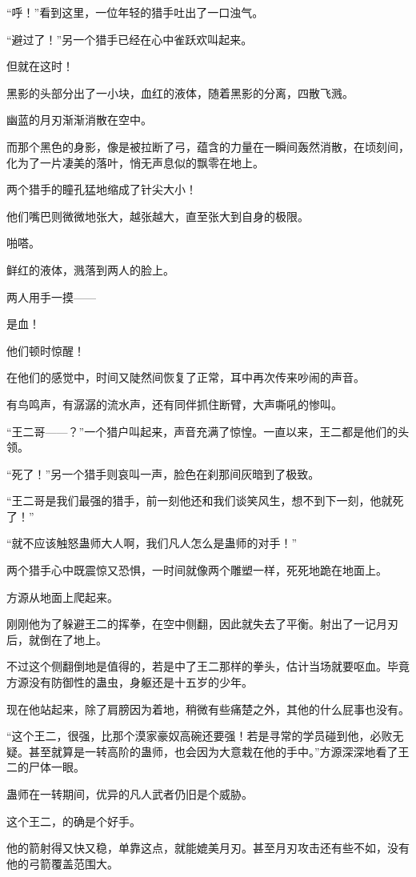 \begin{this_body}
“呼！”看到这里，一位年轻的猎手吐出了一口浊气。

“避过了！”另一个猎手已经在心中雀跃欢叫起来。

但就在这时！

黑影的头部分出了一小块，血红的液体，随着黑影的分离，四散飞溅。

幽蓝的月刃渐渐消散在空中。

而那个黑色的身影，像是被拉断了弓，蕴含的力量在一瞬间轰然消散，在顷刻间，化为了一片凄美的落叶，悄无声息似的飘零在地上。

两个猎手的瞳孔猛地缩成了针尖大小！

他们嘴巴则微微地张大，越张越大，直至张大到自身的极限。

啪嗒。

鲜红的液体，溅落到两人的脸上。

两人用手一摸——

是血！

他们顿时惊醒！

在他们的感觉中，时间又陡然间恢复了正常，耳中再次传来吵闹的声音。

有鸟鸣声，有潺潺的流水声，还有同伴抓住断臂，大声嘶吼的惨叫。

“王二哥——？”一个猎户叫起来，声音充满了惊惶。一直以来，王二都是他们的头领。

“死了！”另一个猎手则哀叫一声，脸色在刹那间灰暗到了极致。

“王二哥是我们最强的猎手，前一刻他还和我们谈笑风生，想不到下一刻，他就死了！”

“就不应该触怒蛊师大人啊，我们凡人怎么是蛊师的对手！”

两个猎手心中既震惊又恐惧，一时间就像两个雕塑一样，死死地跪在地面上。

方源从地面上爬起来。

刚刚他为了躲避王二的挥拳，在空中侧翻，因此就失去了平衡。射出了一记月刃后，就倒在了地上。

不过这个侧翻倒地是值得的，若是中了王二那样的拳头，估计当场就要呕血。毕竟方源没有防御性的蛊虫，身躯还是十五岁的少年。

现在他站起来，除了肩膀因为着地，稍微有些痛楚之外，其他的什么屁事也没有。

“这个王二，很强，比那个漠家豪奴高碗还要强！若是寻常的学员碰到他，必败无疑。甚至就算是一转高阶的蛊师，也会因为大意栽在他的手中。”方源深深地看了王二的尸体一眼。

蛊师在一转期间，优异的凡人武者仍旧是个威胁。

这个王二，的确是个好手。

他的箭射得又快又稳，单靠这点，就能媲美月刃。甚至月刃攻击还有些不如，没有他的弓箭覆盖范围大。


\end{this_body}
